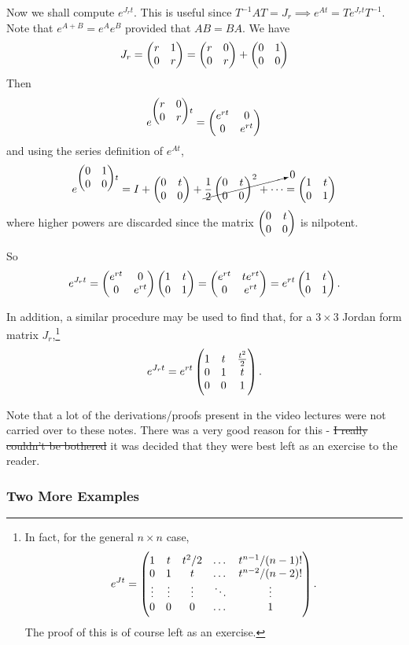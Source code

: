 Now we shall compute $e^{J_rt}$. This is useful since $T^{-1}AT = J_r \implies e^{At} = Te^{J_rt}T^{-1}$. Note that $e^{A+B} = e^A e^B$ provided that $AB = BA$. We have
\[
J_r = \begin{pmatrix}r & 1 \\ 0 & r\end{pmatrix} = \begin{pmatrix}r & 0 \\ 0 & r\end{pmatrix} + \begin{pmatrix}0 & 1 \\ 0 & 0\end{pmatrix}
\]
Then
\[
e^{\begin{pmatrix}r & 0 \\ 0 & r\end{pmatrix}t} = \begin{pmatrix}e^{rt} & 0 \\ 0 & e^{rt}\end{pmatrix}
\]
and using the series definition of $e^{At}$,
\[
e^{\begin{pmatrix}0 & 1 \\ 0 & 0\end{pmatrix}t} = I + \begin{pmatrix}0 & t \\ 0 & 0\end{pmatrix} + \cancelto{0}{\frac12\begin{pmatrix}0 & t \\ 0 & 0\end{pmatrix}^2 + \cdots} = \begin{pmatrix}1 & t \\ 0 & 1\end{pmatrix}
\]
where higher powers are discarded since the matrix $\begin{pmatrix}0 & t \\ 0 & 0\end{pmatrix}$ is nilpotent.

So
\[
e^{J_rt} = \begin{pmatrix}e^{rt} & 0 \\ 0 & e^{rt}\end{pmatrix} \begin{pmatrix}1 & t \\ 0 & 1\end{pmatrix} = \begin{pmatrix}e^{rt} & te^{rt} \\ 0 & e^{rt}\end{pmatrix} = e^{rt} \begin{pmatrix}1 & t \\ 0 & 1\end{pmatrix}.
\]

In addition, a similar procedure may be used to find that, for a $3 \times 3$ Jordan form matrix $J_r$,\footnote{In fact, for the general $n \times n$ case, \[e^{Jt} = \begin{pmatrix}1 & t & t^2/2 & \dots & t^{n-1}/(n-1)! \\ 0 & 1 & t & \dots & t^{n-2}/(n-2)! \\ \vdots & \vdots & \vdots & \ddots & \vdots \\ 0 & 0 & 0 & \dots & 1\end{pmatrix}.\] The proof of this is of course left as an exercise.}
\[
e^{J_rt} = e^{rt} \begin{pmatrix}1 & t & \frac{t^2}{2} \\ 0 & 1 & t \\ 0 & 0 & 1\end{pmatrix}.
\]

Note that a lot of the derivations/proofs present in the video lectures were not carried over to these notes. There was a very good reason for this - \sout{I really couldn't be bothered} it was decided that they were best left as an exercise to the reader.

\subsubsection{Two More Examples}

